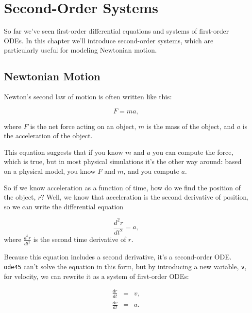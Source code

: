 \chapter{Second-Order Systems}

So far we've seen first-order differential equations and systems of first-order ODEs.  In this chapter we'll introduce second-order systems, which are particularly useful for modeling Newtonian motion.


\section{Newtonian Motion}

Newton's second law of motion is often written like this:

\begin{equation*}
    F = m a,
\end{equation*}

where $F$ is the net force acting on an object, $m$ is the
mass of the object, and $a$ is the acceleration of the object.

This equation suggests
that if you know $m$ and $a$ you can compute the force, which is true,
but in most physical simulations it's the other way around:  based on a
physical model, you know $F$ and $m$, and you compute $a$.


So if we know acceleration as a function of time, how do we
find the position of the object, $r$?  Well, we know that acceleration
is the second derivative of position, so we can write the differential
equation

\begin{equation*}
    \frac{d^2r}{dt^2} = a,
\end{equation*}
where $\frac{d^2r}{dt^2}$ is the second time derivative of $r$.

Because this equation includes a second derivative, it's
a second-order ODE.  \lstinline{ode45} can't solve the equation in this form, but
by introducing a new variable, \lstinline{v}, for velocity, we can rewrite it
as a system of first-order ODEs:

\begin{eqnarray*}
    \frac{dr}{dt} &=& v,   \\
    \frac{dv}{dt} &=& a.
\end{eqnarray*}

